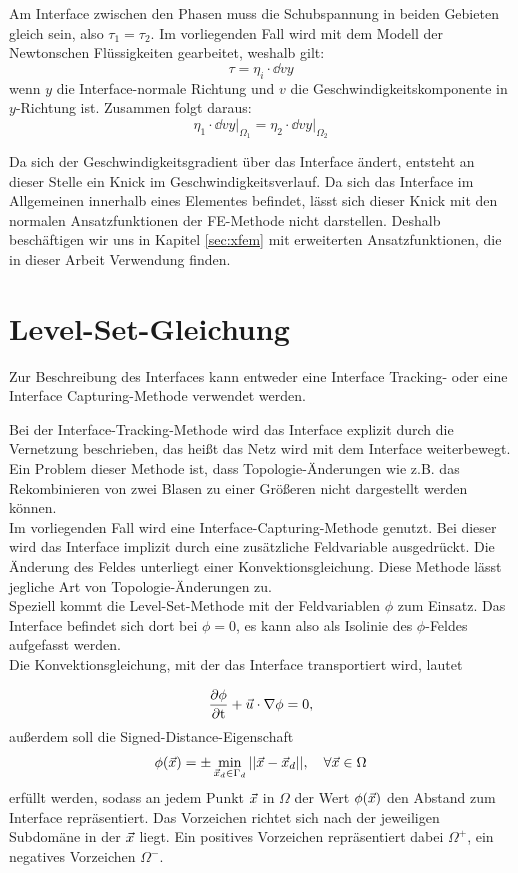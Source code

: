 Am Interface zwischen den Phasen muss die Schubspannung in beiden Gebieten gleich sein, also $\tau_1 = \tau_2$. Im vorliegenden Fall wird mit dem Modell der Newtonschen Flüssigkeiten gearbeitet, weshalb gilt: 
\[\tau = \eta_i\cdot\dd{v}{y}\]
wenn $y$ die Interface-normale Richtung und $v$ die Geschwindigkeitskomponente in $y$-Richtung ist. Zusammen folgt daraus:
\[\eta_1\cdot\dd{v}{y}\biggr|_{\Omega_1} = \eta_2\cdot\dd{v}{y}\biggr|_{\Omega_2}\]

Da sich der Geschwindigkeitsgradient über das Interface ändert, entsteht an dieser Stelle ein Knick im Geschwindigkeitsverlauf. Da sich das Interface im Allgemeinen innerhalb eines Elementes befindet, lässt sich dieser Knick mit den normalen Ansatzfunktionen der FE-Methode nicht darstellen. Deshalb beschäftigen wir uns in Kapitel \ref{sec:xfem} mit erweiterten Ansatzfunktionen, die in dieser Arbeit Verwendung finden.

\section{Level-Set-Gleichung}
Zur Beschreibung des Interfaces kann entweder eine Interface Tracking- oder eine Interface Capturing-Methode verwendet werden.

Bei der Interface-Tracking-Methode wird das Interface explizit durch die
Vernetzung beschrieben, das heißt das Netz wird mit dem Interface weiterbewegt. Ein Problem dieser Methode ist, dass Topologie-Änderungen wie z.B. das Rekombinieren von zwei Blasen zu einer Größeren nicht dargestellt werden können.\\

Im vorliegenden Fall wird eine Interface-Capturing-Methode genutzt. Bei dieser wird das Interface implizit durch eine zusätzliche Feldvariable ausgedrückt. Die Änderung des Feldes unterliegt einer Konvektionsgleichung. Diese Methode lässt jegliche Art von Topologie-Änderungen zu.\\

Speziell kommt die Level-Set-Methode mit der Feldvariablen \(\phi\) zum Einsatz. Das Interface befindet sich dort bei \(\phi = 0\), es kann also als Isolinie des \(\phi\)-Feldes aufgefasst werden.\\

Die Konvektionsgleichung, mit der das Interface transportiert wird, lautet

\begin{equation}
\frac{\partial \phi}{\partial \mathrm{t}} +  \vec{u} \cdot \nabla\phi = 0,
\end{equation}
außerdem soll die Signed-Distance-Eigenschaft
\begin{equation}
 \phi(\vec{x}) = \pm \min_{\vec{x}_d\in\Gamma_d}{||\vec{x}-\vec{x}_d||}, \quad \forall\vec{x} \in \Omega
\end{equation} 
erfüllt werden, sodass an jedem Punkt $\vec{x}$ in $\Omega$ der Wert $\phi(\vec{x})$ den Abstand zum Interface repräsentiert. Das Vorzeichen richtet sich nach der jeweiligen Subdomäne in der $\vec{x}$ liegt. Ein positives Vorzeichen repräsentiert dabei $\Omega^+$, ein negatives Vorzeichen $\Omega^-$.

